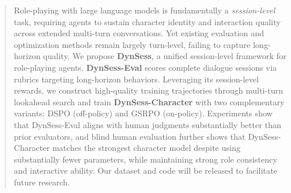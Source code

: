 \documentclass[11pt]{article}
\begin{document}
\begin{abstract}


Role-playing with large language models is fundamentally a \textit{session-level} task, requiring agents to sustain character identity and interaction quality across extended multi-turn conversations. Yet existing evaluation and optimization methods remain largely turn-level, failing to capture long-horizon quality. We propose \textbf{DynSess}, a unified session-level framework for role-playing agents. \textbf{DynSess-Eval} scores complete dialogue sessions via rubrics targeting long-horizon behaviors. Leveraging its session-level rewards, we construct high-quality training trajectories through multi-turn lookahead search and train \textbf{DynSess-Character} with two complementary variants: DSPO (off-policy) and GSRPO (on-policy). Experiments show that DynSess-Eval aligns with human judgments substantially better than prior evaluators, and blind human evaluation further shows that DynSess-Character matches the strongest character model despite using substantially fewer parameters, while maintaining strong role consistency and interactive ability. Our dataset and code will be released to facilitate future research. 





\end{abstract}
\end{document}
